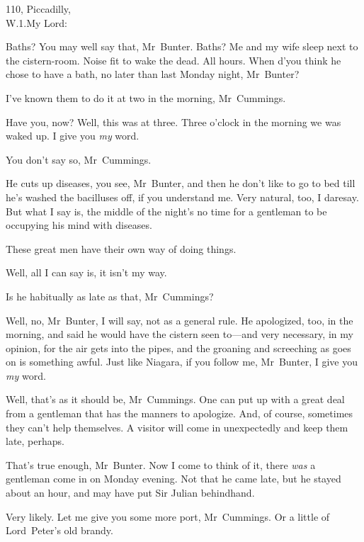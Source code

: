 \begin{mail}{110, Piccadilly,\\W\@.1.}{My Lord:}
\begin{dialogue}
 Baths? You may well say that, Mr~Bunter. Baths? Me and my wife sleep next to the cistern-room. Noise fit to wake the dead. All hours. When d'you think he chose to have a bath, no later than last Monday night, Mr~Bunter?

 I've known them to do it at two in the morning, Mr~Cummings.

 Have you, now? Well, this was at three. Three o'clock in the morning we was waked up. I give you \emph{my} word.

 You don't say so, Mr~Cummings.

 He cuts up diseases, you see, Mr~Bunter, and then he don't like to go to bed till he's washed the bacilluses off, if you understand me. Very natural, too, I daresay. But what I say is, the middle of the night's no time for a gentleman to be occupying his mind with diseases.

 These great men have their own way of doing things.

 Well, all I can say is, it isn't my way.


 Is he habitually as late as that, Mr~Cummings?

 Well, no, Mr~Bunter, I will say, not as a general rule. He apologized, too, in the morning, and said he would have the cistern seen to—and very necessary, in my opinion, for the air gets into the pipes, and the groaning and screeching as goes on is something awful. Just like Niagara, if you follow me, Mr~Bunter, I give you \emph{my} word.

 Well, that's as it should be, Mr~Cummings. One can put up with a great deal from a gentleman that has the manners to apologize. And, of course, sometimes they can't help themselves. A visitor will come in unexpectedly and keep them late, perhaps.

 That's true enough, Mr~Bunter. Now I come to think of it, there \emph{was} a gentleman come in on Monday evening. Not that he came late, but he stayed about an hour, and may have put Sir Julian behindhand.

 Very likely. Let me give you some more port, Mr~Cummings. Or a little of Lord~Peter's old brandy.


\end{dialogue}
\end{mail}
